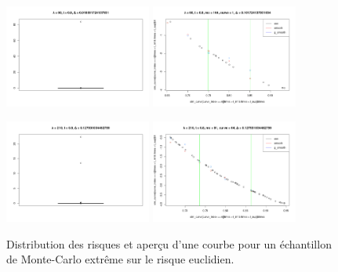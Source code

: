 \begin{figure}[H]
	\centering
	\begin{minipage}{\linewidth}
		\includegraphics[width=0.43\textwidth]{Images/indiv_vs_glob/qq160.png}
		\includegraphics[width=0.43\textwidth]{Images/indiv_vs_glob/lbd60mc164c1.png}
	\end{minipage}

	\begin{minipage}{\linewidth}
		\includegraphics[width=0.43\textwidth]{Images/indiv_vs_glob/qq210.png}
		\includegraphics[width=0.43\textwidth]{Images/indiv_vs_glob/lbd210_mc91_c64.png}
	\end{minipage}
	\caption{Distribution des risques et aperçu d'une courbe pour un échantillon de Monte-Carlo extrême sur le risque euclidien.}
	\label{fig:dist_R_eucl_curves}
\end{figure}

